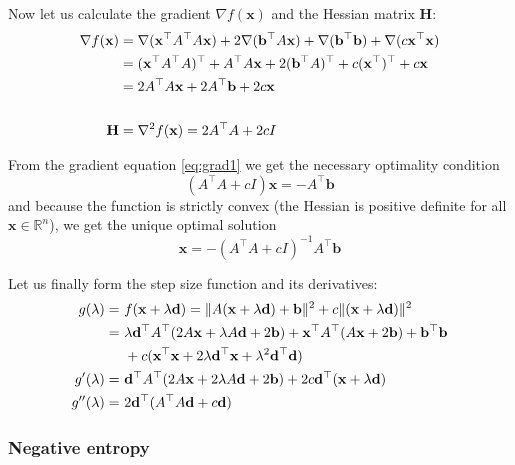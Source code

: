 \documentclass[english, 12pt, a4paper, sci, utf8, a-1b, online, table]{aaltothesis}
\newcommand{\vect}[1]{\ensuremath{\mathbf{#1}}}
\newcommand{\trans}[1]{\ensuremath\vect{#1}^\top}
\newcommand{\norm}[1]{\ensuremath\Vert #1 \Vert}
\begin{document}
Now let us calculate the gradient $\nabla f(\vect{x})$ and the Hessian matrix \textbf{H}:
\begin{align}
    \nabla f(\vect{x}) &= \nabla(\trans{x} A^\top A \vect{x}) + 2 \nabla(\trans{b} A \vect{x}) + \nabla(\trans{b} \vect{b}) + \nabla(c \trans{x} \vect{x}) \nonumber \\
    &= (\trans{x} A^\top A)^\top + A^\top A \vect{x} + 2 (\trans{b} A)^\top + c (\trans{x})^\top + c \vect{x} \nonumber \\
    &= 2 A^\top A \vect{x} + 2 A^\top \vect{b} + 2 c \vect{x} \label{eq:grad1}\\
    &\nonumber \\
    \textbf{H} &= \nabla^2 f(\vect{x}) = 2 A^\top A + 2 c I\label{eq:hess1}
\end{align}

From the gradient equation \eqref{eq:grad1} we get the necessary optimality condition
\begin{equation}
    (A^\top A + c I) \vect{x} = - A^\top \vect{b}
\end{equation}
and because the function is strictly convex (the Hessian is positive definite for all $\vect{x} \in \mathbb{R}^n$), we get the unique optimal solution
\begin{equation}
    \vect{x} = - (A^\top A + c I)^{-1} A^\top \vect{b}
\end{equation}

Let us finally form the step size function and its derivatives:
\begin{align}
    g(\lambda) =\ &f(\vect{x} + \lambda \vect{d}) = \norm{A (\vect{x} + \lambda \vect{d}) + \vect{b}} ^ 2 + c \norm{(\vect{x} + \lambda \vect{d})} ^ 2 \nonumber \\
    =\ &\lambda \trans{d} A^\top ( 2 A \vect{x} + \lambda A \vect{d} + 2 \vect{b}) + \trans{x} A^\top ( A \vect{x} + 2 \vect{b} ) + \trans{b} \vect{b} \\
    &+ c ( \trans{x} \vect{x} + 2 \lambda \trans{d} \vect{x} + \lambda ^ 2 \trans{d} \vect{d}) \nonumber \\
    g'(\lambda) =\ &\trans{d} A^\top ( 2 A \vect{x} + 2 \lambda A \vect{d} + 2 \vect{b} ) + 2 c \trans{d} ( \vect{x} + \lambda \vect{d} ) \\
    g''(\lambda) =\ &2 \trans{d} ( A^\top A \vect{d} + c \vect{d})
\end{align}


\subsubsection{Negative entropy}
\end{document}
